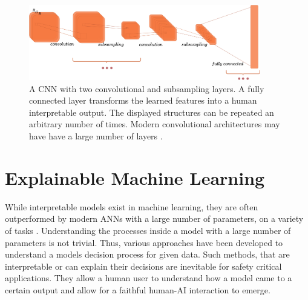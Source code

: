 \documentclass[a4paper,cleardoubleempty,BCOR1cm, 11pt]{report}
\begin{document}
\begin{figure}
	\centering
		\includegraphics[width=0.9\textwidth]{images/convnet.pdf} 
		\caption{A CNN with two convolutional and subsampling layers. A fully connected layer transforms the learned features into a human interpretable output. The displayed structures can be repeated an arbitrary number of times. Modern convolutional architectures may have have a large number of layers \cite{he2016deep,szegedy2015going,xie2017aggregated}.}
		\label{fig:convnet}
\end{figure}


\section{Explainable Machine Learning}
While interpretable models exist in machine learning, they are often outperformed by modern ANNs with a large number of parameters, on a variety of tasks \cite{gunning2019xai, guo2020explainable, sarkar2016accuracy, puiutta2020explainable}. Understanding the processes inside a model with a large number of parameters is not trivial. Thus, various approaches have been developed to understand a models decision process for given data. Such methods, that are interpretable or can explain their decisions are inevitable for safety critical applications. They allow a human user to understand how a model came to a certain output and allow for a faithful human-AI interaction to emerge.
\end{document}

